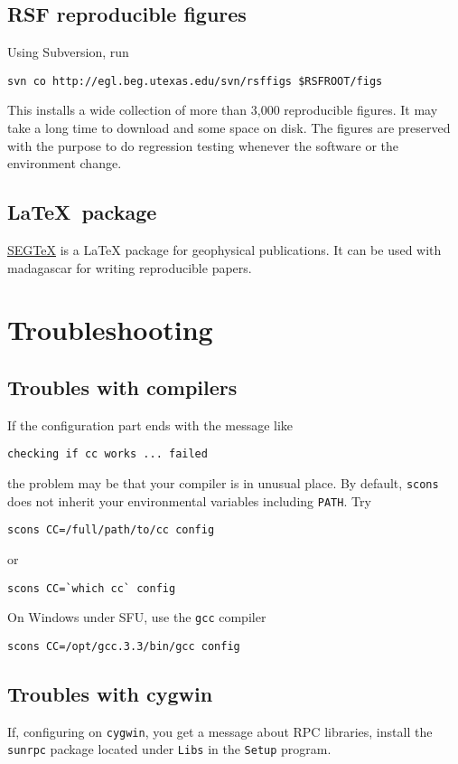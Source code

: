 \subsection{RSF reproducible figures}

Using Subversion, run
\begin{verbatim}
svn co http://egl.beg.utexas.edu/svn/rsffigs $RSFROOT/figs
\end{verbatim}
This installs a wide collection of more than 3,000 reproducible
figures. It may take a long time to download and some space on disk.
The figures are preserved with the purpose to do regression testing
whenever the software or the environment change.

\subsection{\LaTeX\ package}

\href{http://segtex.sourceforge.net}{SEGTeX} is a LaTeX package for geophysical publications. 
It can be used with madagascar for writing reproducible papers.

\section{Troubleshooting}

\subsection{Troubles with compilers}
If the configuration part ends with the message like
\begin{verbatim}
checking if cc works ... failed
\end{verbatim}
the problem may be that your compiler is in unusual place. By default,
\texttt{scons} does not inherit your environmental variables including
\texttt{PATH}. Try
\begin{verbatim}
scons CC=/full/path/to/cc config
\end{verbatim}
or
\begin{verbatim}
scons CC=`which cc` config
\end{verbatim}

On Windows under SFU, use the \texttt{gcc} compiler
\begin{verbatim}
scons CC=/opt/gcc.3.3/bin/gcc config
\end{verbatim}

\subsection{Troubles with cygwin}
If, configuring on \texttt{cygwin}, you get a message about RPC
libraries, install the \texttt{sunrpc} package located under
\texttt{Libs} in the \texttt{Setup} program.

%

